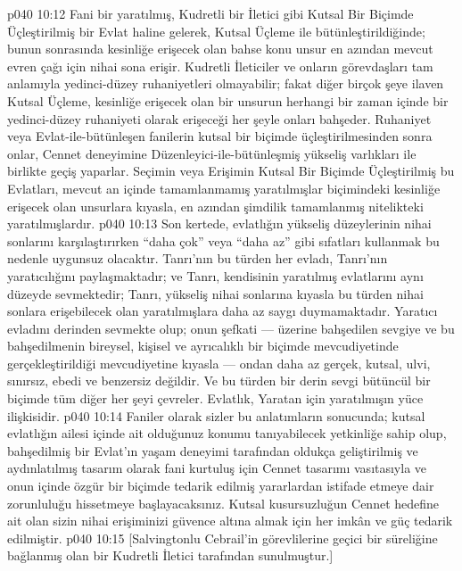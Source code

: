 \vs p040 10:12 Fani bir yaratılmış, Kudretli bir İletici gibi Kutsal Bir Biçimde Üçleştirilmiş bir Evlat haline gelerek, Kutsal Üçleme ile bütünleştirildiğinde; bunun sonrasında kesinliğe erişecek olan bahse konu unsur en azından mevcut evren çağı için nihai sona erişir. Kudretli İleticiler ve onların görevdaşları tam anlamıyla yedinci\hyp{}düzey ruhaniyetleri olmayabilir; fakat diğer birçok şeye ilaven Kutsal Üçleme, kesinliğe erişecek olan bir unsurun herhangi bir zaman içinde bir yedinci\hyp{}düzey ruhaniyeti olarak erişeceği her şeyle onları bahşeder. Ruhaniyet veya Evlat\hyp{}ile\hyp{}bütünleşen fanilerin kutsal bir biçimde üçleştirilmesinden sonra onlar, Cennet deneyimine Düzenleyici\hyp{}ile\hyp{}bütünleşmiş yükseliş varlıkları ile birlikte geçiş yaparlar. Seçimin veya Erişimin Kutsal Bir Biçimde Üçleştirilmiş bu Evlatları, mevcut an içinde tamamlanmamış yaratılmışlar biçimindeki kesinliğe erişecek olan unsurlara kıyasla, en azından şimdilik tamamlanmış nitelikteki yaratılmışlardır.
\vs p040 10:13 Son kertede, evlatlığın yükseliş düzeylerinin nihai sonlarını karşılaştırırken “daha çok” veya “daha az” gibi sıfatları kullanmak bu nedenle uygunsuz olacaktır. Tanrı’nın bu türden her evladı, Tanrı’nın yaratıcılığını paylaşmaktadır; ve Tanrı, kendisinin yaratılmış evlatlarını aynı düzeyde sevmektedir; Tanrı, yükseliş nihai sonlarına kıyasla bu türden nihai sonlara erişebilecek olan yaratılmışlara daha az saygı duymamaktadır. Yaratıcı  evladını derinden sevmekte olup; onun şefkati --- üzerine bahşedilen sevgiye ve bu bahşedilmenin bireysel, kişisel ve ayrıcalıklı bir biçimde  mevcudiyetinde gerçekleştirildiği mevcudiyetine kıyasla --- ondan daha az gerçek, kutsal, ulvi, sınırsız, ebedi ve benzersiz değildir. Ve bu türden bir derin sevgi bütüncül bir biçimde tüm diğer her şeyi çevreler. Evlatlık, Yaratan için yaratılmışın yüce ilişkisidir.
\vs p040 10:14 Faniler olarak sizler bu anlatımların sonucunda; kutsal evlatlığın ailesi içinde ait olduğunuz konumu tanıyabilecek yetkinliğe sahip olup, bahşedilmiş bir Evlat’ın yaşam deneyimi tarafından oldukça geliştirilmiş ve aydınlatılmış tasarım olarak fani kurtuluş için Cennet tasarımı vasıtasıyla ve onun içinde özgür bir biçimde tedarik edilmiş yararlardan istifade etmeye dair zorunluluğu hissetmeye başlayacaksınız. Kutsal kusursuzluğun Cennet hedefine ait olan sizin nihai erişiminizi güvence altına almak için her imkân ve güç tedarik edilmiştir.
\vs p040 10:15 [Salvingtonlu Cebrail’in görevlilerine geçici bir süreliğine bağlanmış olan bir Kudretli İletici tarafından sunulmuştur.]
